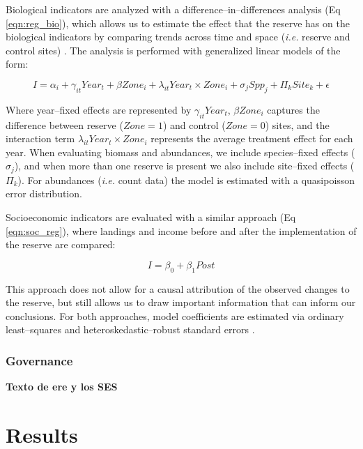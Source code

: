 \documentclass{frontiersSCNS}
\theoremstyle{definition}
\theoremstyle{definition}
\theoremstyle{definition}
\theoremstyle{remark}
\begin{document}
Biological indicators are analyzed with a difference--in--differences
analysis (Eq \ref{eqn:reg_bio}), which allows us to estimate the effect
that the reserve has on the biological indicators by comparing trends
across time and space (\emph{i.e.} reserve and control sites)
\citep{moland_2013-VP,Villasenor-Derbez_2018}. The analysis is performed
with generalized linear models of the form:

\begin{equation}
I = \alpha_{i} + \gamma_{it} Year_t + \beta Zone_i + \lambda_{it} Year_t\times Zone_i + \sigma_jSpp_j + \Pi_{k}Site_k + \epsilon
\label{eqn:reg_bio}
\end{equation}

Where year--fixed effects are represented by \(\gamma_{it} Year_t\),
\(\beta Zone_i\) captures the difference between reserve (\(Zone = 1\))
and control (\(Zone = 0\)) sites, and the interaction term
\(\lambda_{it} Year_t\times Zone_i\) represents the average treatment
effect for each year. When evaluating biomass and abundances, we include
species--fixed effects (\(\sigma_j\)), and when more than one reserve is
present we also include site--fixed effects (\(\Pi_k\)). For abundances
(\emph{i.e.} count data) the model is estimated with a quasipoisson
error distribution.

Socioeconomic indicators are evaluated with a similar approach (Eq
\ref{eqn:soc_reg}), where landings and income before and after the
implementation of the reserve are compared:

\begin{equation}
I = \beta_0 + \beta_1Post
\label{eqn:soc_reg}
\end{equation}

This approach does not allow for a causal attribution of the observed
changes to the reserve, but still allows us to draw important
information that can inform our conclusions. For both approaches, model
coefficients are estimated via ordinary least--squares and
heteroskedastic--robust standard errors \citep{zeileis_2004-7n}.

\subsubsection{Governance}\label{governance}

\textbf{Texto de ere y los SES}

\section{Results}\label{results}
\end{document}
